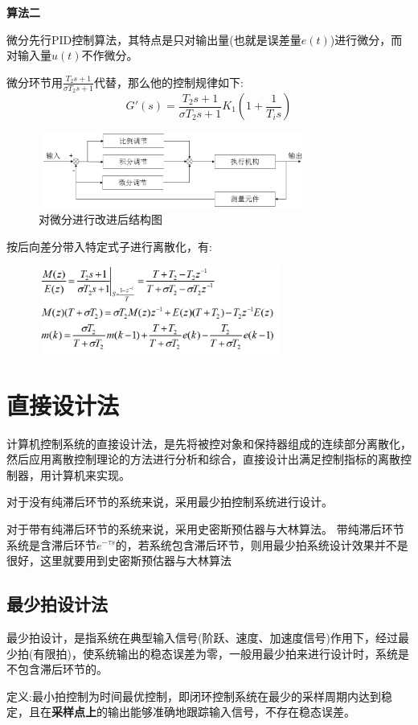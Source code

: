 \documentclass[12pt, a4paper, oneside]{ctexbook}
\begin{document}
\textbf{算法二}

微分先行PID控制算法，其特点是只对输出量(也就是误差量$e(t)$)进行微分，而对输入量$u(t)$不作微分。

微分环节用$\frac{T_2s+1}{\sigma T_2s+1}$代替，那么他的控制规律如下:
$$
G'(s)=\frac{T_2s+1}{\sigma T_2s+1}K_1(1+\frac{1}{T_is})
$$

\begin{figure}[htbp]
	\centering
	\includegraphics[width=8.8cm,height=2.5cm]{img/5_9.png}
	\caption{对微分进行改进后结构图}
\end{figure}

按后向差分带入特定式子进行离散化，有:
\begin{figure}[htbp]
	\centering
	\includegraphics[width=8cm,height=2.9cm]{img/5_10.png}
\end{figure}
\newpage
\section{直接设计法}
计算机控制系统的直接设计法，是先将被控对象和保持器组成的连续部分离散化，然后应用离散控制理论的方法进行分析和综合，直接设计出满足控制指标的离散控制器，用计算机来实现。

对于没有纯滞后环节的系统来说，采用最少拍控制系统进行设计。

对于带有纯滞后环节的系统来说，采用史密斯预估器与大林算法。
带纯滞后环节系统是含滞后环节$e^{-\tau s}$的，若系统包含滞后环节，则用最少拍系统设计效果并不是很好，这里就要用到史密斯预估器与大林算法
\subsection{最少拍设计法}
最少拍设计，是指系统在典型输入信号(阶跃、速度、加速度信号)作用下，经过最少拍(有限拍)，使系统输出的稳态误差为零，一般用最少拍来进行设计时，系统是不包含滞后环节的。

定义:最小拍控制为时间最优控制，即闭环控制系统在最少的采样周期内达到稳定，且在\textbf{采样点上}的输出能够准确地跟踪输入信号，不存在稳态误差。
\end{document}
